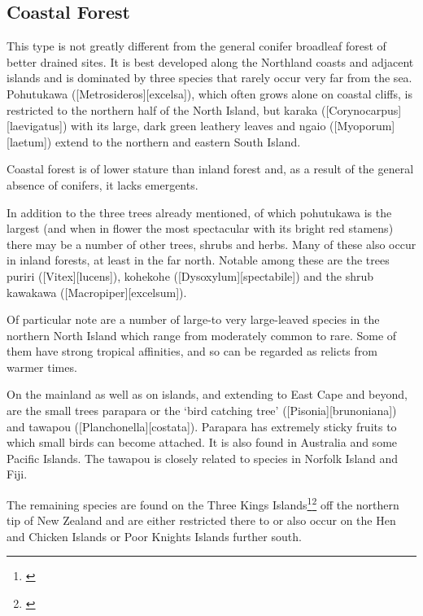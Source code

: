 \subsection{Coastal Forest}

This type is not greatly different from the general conifer broadleaf forest of better drained sites.
It is best developed along the Northland coasts and adjacent islands and is dominated by three species that rarely occur very far from the sea.
Pohutukawa ([Metrosideros][excelsa]), which often grows alone on coastal cliffs, is restricted to the northern half of the North Island, but karaka ([Corynocarpus][laevigatus]) with its large, dark green leathery leaves and ngaio ([Myoporum][laetum]) extend to the northern and eastern South Island.

Coastal forest is of lower stature than inland forest and, as a result of the general absence of conifers, it lacks emergents.

In addition to the three trees already mentioned, of which pohutukawa is the largest (and when in flower the most spectacular with its bright red stamens) there may be a number of other trees, shrubs and herbs.
Many of these also occur in inland forests, at least in the far north.
Notable among these are the trees puriri ([Vitex][lucens]), kohekohe ([Dysoxylum][spectabile]) and the shrub kawakawa ([Macropiper][excelsum]).

Of particular note are a number of large-to very large-leaved species in the northern North Island which range from moderately common to rare.
Some of them have strong tropical affinities, and so can be regarded as relicts from warmer times.

On the mainland as well as on islands, and extending to East Cape and beyond, are the small trees parapara or the `bird catching tree' ([Pisonia][brunoniana]) and tawapou ([Planchonella][costata]).
Parapara has extremely sticky fruits to which small birds can become attached.
It is also found in Australia and some Pacific Islands.
The tawapou is closely related to species in Norfolk Island and Fiji.

The remaining species are found on the Three Kings Islands\footnote{\cite{baylis1948vegetation}}\footnote{\cite{oliver1948flora}} off the northern tip of New Zealand and are either restricted there to or also occur on the Hen and Chicken Islands or Poor Knights Islands further south.


